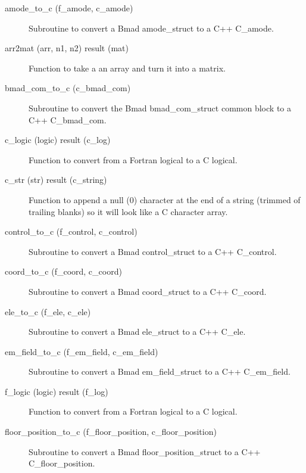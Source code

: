 \begin{description}

\label{r:amode.to.c}
\item[amode_to_c (f_amode, c_amode)] \Newline 
Subroutine to convert a Bmad amode_struct to a C++ C_amode.

\label{r:arr2mat}
\item[arr2mat (arr, n1, n2) result (mat)] \Newline 
Function to take a an array and turn it into a matrix.

\label{r:bmad.com.to.c}
\item[bmad_com_to_c (c_bmad_com)] \Newline 
Subroutine to convert the Bmad bmad_com_struct common block to 
a C++ C_bmad_com.

\label{r:c.logic}
\item[c_logic (logic) result (c_log)] \Newline 
Function to convert from a Fortran logical to a C logical.

\label{r:c.str}
\item[c_str (str) result (c_string)] \Newline 
Function to append a null (0) character at the end of a string (trimmed
of trailing blanks) so it will look like a C character array. 

\label{r:control.to.c}
\item[control_to_c (f_control, c_control)] \Newline 
Subroutine to convert a Bmad control_struct to a C++ C_control.

\label{r:coord.to.c}
\item[coord_to_c (f_coord, c_coord)] \Newline 
Subroutine to convert a Bmad coord_struct to a C++ C_coord.

\label{r:ele.to.c}
\item[ele_to_c (f_ele, c_ele)] \Newline 
Subroutine to convert a Bmad ele_struct to a C++ C_ele.

\label{r:em.field.to.c}
\item[em_field_to_c (f_em_field, c_em_field)] \Newline 
Subroutine to convert a Bmad em_field_struct to a C++ C_em_field.

\label{r:f.logic}
\item[f_logic (logic) result (f_log)] \Newline 
Function to convert from a Fortran logical to a C logical.

\label{r:floor.position.to.c}
\item[floor_position_to_c (f_floor_position, c_floor_position)] \Newline 
Subroutine to convert a Bmad floor_position_struct to a C++ C_floor_position.


\end{description}
